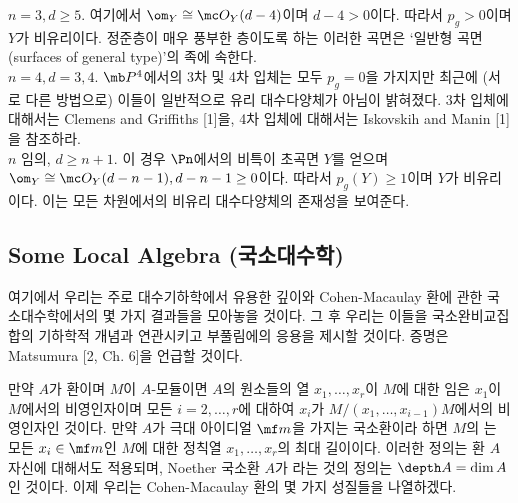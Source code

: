 \begin{example}
	$n=3,d\ge 5$. 여기에서 $\om_Y\cong\mc O_Y(d-4)$이며 $d-4>0$이다. 따라서 $p_g>0$이며 $Y$가 비유리이다.
	정준층이 매우 풍부한 층이도록 하는 이러한 곡면은 `일반형 곡면(surfaces of general type)'의 족에 속한다.\\
	$n=4,d=3,4$. $\mb P^4$에서의 3차 및 4차 입체는 모두 $p_g=0$을 가지지만 최근에 (서로 다른 방법으로)
	이들이 일반적으로 유리 대수다양체가 아님이 밝혀졌다.
	3차 입체에 대해서는 Clemens and Griffiths [1]을, 4차 입체에 대해서는 Iskovskih and Manin [1]을 참조하라.\\
	$n$ 임의, $d\ge n+1$. 이 경우 $\Pn$에서의 비특이 초곡면 $Y$를 얻으며
	$\om_Y\cong\mc O_Y(d-n-1),d-n-1\ge 0$이다. 따라서 $p_g(Y)\ge 1$이며 $Y$가 비유리이다.
	이는 모든 차원에서의 비유리 대수다양체의 존재성을 보여준다.
	\end{example}
	
	
	\subsection*{Some Local Algebra (국소대수학)}
	여기에서 우리는 주로 대수기하학에서 유용한 깊이와 Cohen-Macaulay 환에 관한 국소대수학에서의 몇 가지 결과들을 모아놓을 것이다.
	그 후 우리는 이들을 국소완비교집합의 기하학적 개념과 연관시키고 부풀림에의 응용을 제시할 것이다.
	증명은 Matsumura [2, Ch. 6]을 언급할 것이다.
	
	만약 $A$가 환이며 $M$이 $A$-모듈이면 $A$의 원소들의 열 $x_1,\ldots,x_r$이 $M$에 대한 임은
	$x_1$이 $M$에서의 비영인자이며 모든 $i=2,\ldots,r$에 대하여 $x_i$가 $M/(x_1,\ldots,x_{i-1})M$에서의 비영인자인 것이다.
	만약 $A$가 극대 아이디얼 $\mf m$을 가지는 국소환이라 하면 $M$의 는
	모든 $x_i\in\mf m$인 $M$에 대한 정칙열 $x_1,\ldots,x_r$의 최대 길이이다.
	이러한 정의는 환 $A$ 자신에 대해서도 적용되며,
	Noether 국소환 $A$가 라는 것의 정의는 $\depth A=\dim A$인 것이다.
	이제 우리는 Cohen-Macaulay 환의 몇 가지 성질들을 나열하겠다.
	
